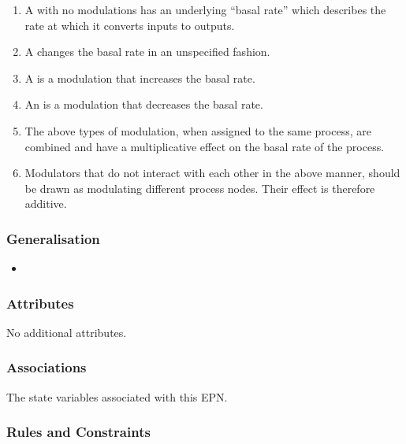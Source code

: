 \begin{enumerate}
\item A  with no modulations has an underlying ``basal rate''
  which describes the rate at which it converts inputs to outputs.
\item A  changes the basal rate in an unspecified fashion.
\item A  is a modulation that increases the basal rate.
\item An  is a modulation that decreases the basal rate.
\item The above types of modulation, when assigned to the same process, are combined and have a multiplicative effect on the basal rate of the process.
\item Modulators that do not interact with each other in the above manner, should be drawn as modulating different process nodes. Their effect is therefore additive.
\end{enumerate}

\subsubsection{Generalisation}

\begin{itemize}
\item {}
\end{itemize}

\subsubsection{Attributes}

No additional attributes.

\subsubsection{Associations}

\begin{attributes}
 The state variables
  associated with this EPN.
\end{attributes}

\subsubsection{Rules and Constraints}

